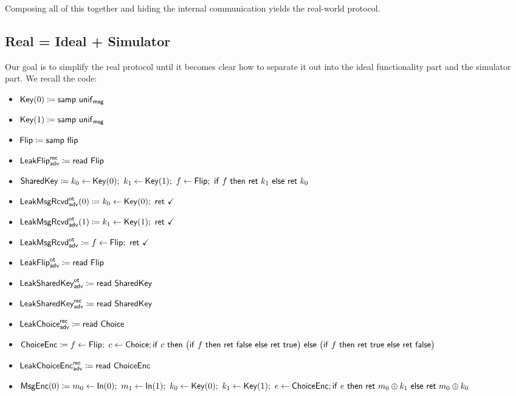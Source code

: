 Composing all of this together and hiding the internal communication yields the real-world protocol.

\subsection{Real = Ideal + Simulator}
Our goal is to simplify the real protocol until it becomes clear how to separate it out into the ideal functionality part and the simulator part. We recall the code:

\begin{itemize}
\item $\mathsf{Key}(0) \coloneqq \mathsf{samp} \ \mathsf{unif}_{\mathsf{msg}}$
\item $\mathsf{Key}(1) \coloneqq \mathsf{samp} \ \mathsf{unif}_{\mathsf{msg}}$
\item $\mathsf{Flip} \coloneqq \mathsf{samp} \ \mathsf{flip}$
\item {\color{blue} $\mathsf{LeakFlip}^{\mathsf{rec}}_{\mathsf{adv}} \coloneqq \mathsf{read} \ \mathsf{Flip}$}
\item $\SharedKey \coloneqq k_0 \leftarrow \Key(0); \ k_1 \leftarrow \Key(1); \ f \leftarrow \Flip; \ \ifte{f}{\ret{k_1}}{\ret{k_0}}$
\item {\color{blue} $\LeakKeyRcvd^\ot_\adv(0) \coloneqq k_0 \leftarrow \Key(0); \ \ret{\checkmark}$}
\item {\color{blue} $\LeakKeyRcvd^\ot_\adv(1) \coloneqq k_1 \leftarrow \Key(1); \ \ret{\checkmark}$}
\item {\color{blue} $\mathsf{LeakMsgRcvd}^{\mathsf{ot}}_{\mathsf{adv}} \coloneqq f \leftarrow \mathsf{Flip}; \ \mathsf{ret} \ \checkmark$}
\item {\color{blue} $\mathsf{LeakFlip}^{\mathsf{ot}}_{\mathsf{adv}} \coloneqq \mathsf{read} \ \mathsf{Flip}$}
\item {\color{blue} $\mathsf{LeakSharedKey}^{\mathsf{ot}}_{\mathsf{adv}} \coloneqq \mathsf{read} \ \mathsf{SharedKey}$}
\item {\color{blue} $\mathsf{LeakSharedKey}^{\mathsf{rec}}_{\mathsf{adv}} \coloneqq \mathsf{read} \ \mathsf{SharedKey}$}
\item {\color{blue} $\mathsf{LeakChoice}^{\mathsf{rec}}_{\mathsf{adv}} \coloneqq \mathsf{read} \ \mathsf{Choice}$}
\item $\mathsf{ChoiceEnc} \coloneqq f \leftarrow \mathsf{Flip}; \ c \leftarrow \mathsf{Choice}; \\ \mathsf{if} \ c \ \mathsf{then} \ \big(\mathsf{if} \ f \ \mathsf{then} \ \mathsf{ret} \ \mathsf{false} \ \mathsf{else} \ \mathsf{ret} \ \mathsf{true}\big) \ \mathsf{else} \ \big(\mathsf{if} \ f \ \mathsf{then} \ \mathsf{ret} \ \mathsf{true} \ \mathsf{else} \ \mathsf{ret} \ \mathsf{false}\big)$
\item {\color{blue} $\mathsf{LeakChoiceEnc}^{\mathsf{rec}}_{\mathsf{adv}} \coloneqq \mathsf{read} \ \mathsf{ChoiceEnc}$}
\item $\mathsf{MsgEnc}(0) \coloneqq m_0 \leftarrow \mathsf{In}(0); \ m_1 \leftarrow \mathsf{In}(1); \ k_0 \leftarrow \mathsf{Key}(0); \ k_1 \leftarrow \mathsf{Key}(1); \ e \leftarrow \mathsf{ChoiceEnc}; \\ \mathsf{if} \ e \ \mathsf{then} \ \mathsf{ret} \ m_0 \oplus k_1 \ \mathsf{else} \ \mathsf{ret} \ m_0 \oplus k_0$

\end{itemize}
